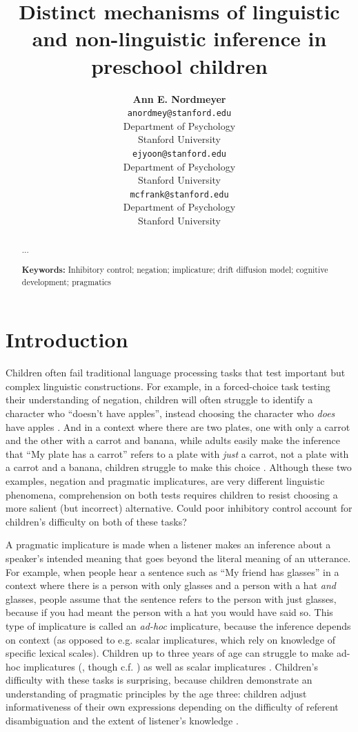 \documentclass[10pt,letterpaper]{article}
\title{Distinct mechanisms of linguistic and non-linguistic inference in preschool children}
\author{{\large \bf Ann E. Nordmeyer} \\
  \texttt{anordmey@stanford.edu} \\
  Department of Psychology \\
  Stanford University
  \And {\large \bf Erica J. Yoon} \\
  \texttt{ejyoon@stanford.edu} \\
  Department of Psychology \\
  Stanford University
  \And {\large \bf Michael C. Frank} \\
  \texttt{mcfrank@stanford.edu} \\
  Department of Psychology \\
  Stanford University}
\newcommand{\aen}[1]{\textcolor{DarkOrange}{[aen: #1]}}
\begin{document}
\maketitle


\begin{abstract}

...

\textbf{Keywords:} 
Inhibitory control; negation; implicature; drift diffusion model; cognitive development; pragmatics

\end{abstract}


\section{Introduction}
Children often fail traditional language processing tasks that test important but complex linguistic constructions.  For example, in a forced-choice task testing their understanding of negation, children will often struggle to identify a character who ``doesn't have apples'', instead choosing the character who \emph{does} have apples \cite{nordmeyer2014b}.  And in a context where there are two plates, one with only a carrot and the other with a carrot and banana, while adults easily make the inference that ``My plate has a carrot'' refers to a plate with \emph{just} a carrot, not a plate with a carrot and a banana, children struggle to make this choice \cite{yoonchildren}.   Although these two examples, negation and pragmatic implicatures, are very different linguistic phenomena, comprehension on both tests requires children to resist choosing a more salient (but incorrect) alternative.  Could poor inhibitory control account for children's difficulty on both of these tasks?

A pragmatic implicature \cite{grice1975} is made when a listener makes an inference about a speaker's intended meaning that goes beyond the literal meaning of an utterance.  For example, when people hear a sentence such as ``My friend has glasses'' in a context where there is a person with only glasses and a person with a hat \emph{and} glasses, people assume that the sentence refers to the person with just glasses, because if you had meant the person with a hat you would have said so.  This type of implicature is called an \emph{ad-hoc} implicature, because the inference depends on context (as opposed to e.g. scalar implicatures, which rely on knowledge of specific lexical scales).  Children up to three years of age can struggle to make ad-hoc implicatures (, though c.f. ) as well as scalar implicatures \cite{huang2009}.  Children's difficulty with these tasks is surprising, because children demonstrate an understanding of pragmatic principles by the age three: children adjust informativeness of their own expressions depending on the difficulty of referent disambiguation \cite{matthews2006} and the extent of listener's knowledge \cite{matthews2012tw}.  %
\end{document}
